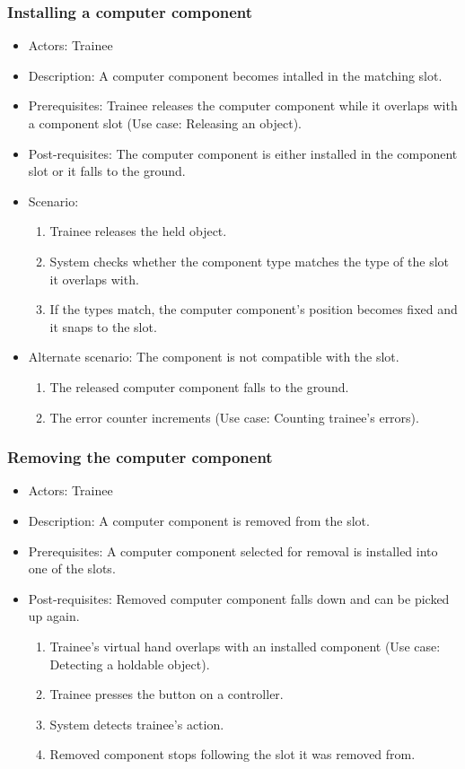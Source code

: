 \subsubsection{Installing a computer component}
\begin{itemize}
\item Actors: Trainee
\item Description: A computer component becomes intalled in the matching slot.
\item Prerequisites: Trainee releases the computer component while it overlaps with a component slot (Use case: Releasing an object).
\item Post-requisites: The computer component is either installed in the component slot or it falls to the ground.
\item Scenario: 
\begin{enumerate}
    \item Trainee releases the held object.
    \item System checks whether the component type matches the type of the slot it overlaps with.
    \item If the types match, the computer component's position becomes fixed and it snaps to the slot.
\end{enumerate}
\item Alternate scenario: The component is not compatible with the slot.
\begin{enumerate}
\item The released computer component falls to the ground.
\item The error counter increments (Use case: Counting trainee's errors).
\end{enumerate}
\end{itemize}


\subsubsection{Removing the computer component}
\begin{itemize}
\item Actors: Trainee
\item Description: A computer component is removed from the slot.
\item Prerequisites: A computer component selected for removal is installed into one of the slots.
\item Post-requisites: Removed computer component falls down and can be picked up again.
\begin{enumerate}
    \item Trainee's virtual hand overlaps with an installed component (Use case: Detecting a holdable object).
    \item Trainee presses the button on a controller.
    \item System detects trainee's action.
    \item Removed component stops following the slot it was removed from.
\end{enumerate}


\end{itemize}


